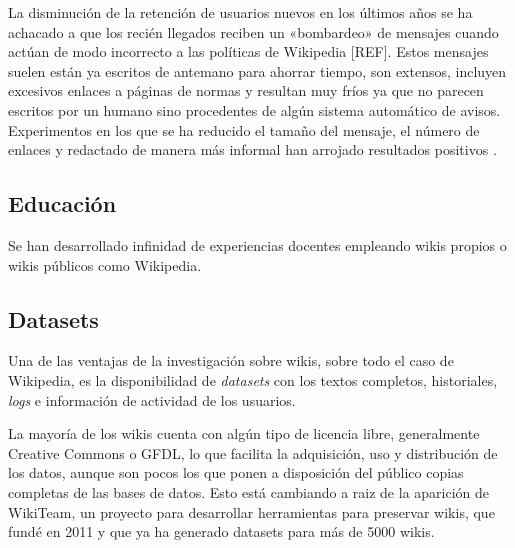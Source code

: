 \documentclass[11pt,onecolumn]{article}
\begin{document}


\citep{zhang2012}


La disminución de la retención de usuarios nuevos en los últimos años se ha achacado a que los recién llegados reciben un «bombardeo» de mensajes cuando actúan de modo incorrecto a las políticas de Wikipedia [REF]. Estos mensajes suelen están ya escritos de antemano para ahorrar tiempo, son extensos, incluyen excesivos enlaces a páginas de normas y resultan muy fríos ya que no parecen escritos por un humano sino procedentes de algún sistema automático de avisos. Experimentos en los que se ha reducido el tamaño del mensaje, el número de enlaces y redactado de manera más informal han arrojado resultados positivos \citep{faulkner2012}.

\subsection{Educación}




Se han desarrollado infinidad de experiencias docentes empleando wikis propios o wikis públicos como Wikipedia.

\citep{consiglio2012}

\subsection{Datasets}


Una de las ventajas de la investigación sobre wikis, sobre todo el caso de Wikipedia, es la disponibilidad de \emph{datasets} con los textos completos, historiales, \emph{logs} e información de actividad de los usuarios.

La mayoría de los wikis cuenta con algún tipo de licencia libre, generalmente Creative Commons o GFDL, lo que facilita la adquisición, uso y distribución de los datos, aunque son pocos los que ponen a disposición del público copias completas de las bases de datos. Esto está cambiando a raiz de la aparición de WikiTeam, un proyecto para desarrollar herramientas para preservar wikis, que fundé en 2011 y que ya ha generado datasets para más de 5000 wikis.
\end{document}

